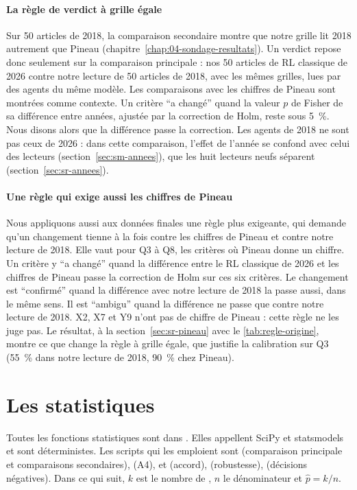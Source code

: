 \paragraph{La règle de verdict à grille égale}
Sur 50 articles de 2018, la comparaison secondaire montre que notre grille lit 2018 autrement que
Pineau (chapitre~\ref{chap:04-sondage-resultats}). Un verdict repose donc seulement sur la comparaison
principale : nos 50 articles de RL classique de 2026 contre notre lecture de 50 articles de 2018, avec
les mêmes grilles, lues par des agents du même modèle. Les comparaisons avec les chiffres de Pineau
sont montrées comme contexte. Un
critère \enquote{a changé} quand la valeur $p$ de Fisher de sa différence entre années, ajustée par la
correction de Holm, reste sous 5~\%. Nous disons alors que la différence passe la correction. Les
agents de 2018 ne sont pas ceux de 2026 : dans cette comparaison, l'effet de l'année se confond avec
celui des lecteurs (section~\ref{sec:sm-annees}), que les huit lecteurs neufs séparent
(section~\ref{sec:sr-annees}).

\paragraph{Une règle qui exige aussi les chiffres de Pineau}
Nous appliquons aussi aux données finales une règle plus exigeante, qui demande qu'un changement tienne
à la fois contre les chiffres de Pineau et contre notre lecture de 2018. Elle vaut pour Q3 à Q8, les
critères où Pineau donne un chiffre.
Un critère y \enquote{a changé} quand la différence entre le RL classique de 2026 et les chiffres de
Pineau passe la correction de Holm sur ces six critères. Le changement est \enquote{confirmé} quand la
différence avec notre lecture de 2018 la passe aussi, dans le même sens. Il est \enquote{ambigu} quand
la différence ne passe que contre notre lecture de 2018. X2, X7 et Y9 n'ont pas de chiffre de Pineau :
cette règle ne les juge pas. Le résultat, à la section~\ref{sec:sr-pineau} avec le
\cref{tab:regle-origine}, montre ce que change la règle à grille égale, que justifie la calibration
sur Q3 (55~\% dans notre lecture de 2018, 90~\% chez Pineau).

\section{Les statistiques}\label{sec:sm-stats}

Toutes les fonctions statistiques sont dans . Elles appellent SciPy et
statsmodels et sont déterministes. Les scripts qui les emploient sont 
(comparaison principale et comparaisons secondaires),  (A4),
 et  (accord), 
(robustesse),  (décisions négatives). Dans ce qui suit, $k$ est le nombre
de , $n$ le dénominateur et $\hat{p} = k / n$.

